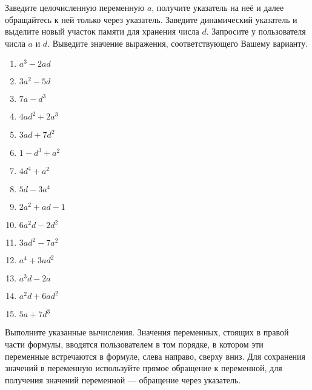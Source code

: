 
\labtask

Заведите целочисленную переменную $a$, получите указатель на неё и далее обращайтесь к ней только через указатель.
Заведите динамический указатель и выделите новый участок памяти для хранения числа $d$.
Запросите у пользователя числа $a$ и $d$.
Выведите значение выражения, соответствующего Вашему варианту.

\begin{enumerate}

\item $a^3-2ad$

\item $3a^2-5d$

\item  $7a-d^3$

\item  $4ad^2+2a^3$

\item  $3ad+7d^2$

\item  $1-d^3+a^2$

\item  $4d^4+a^2$

\item  $5d-3a^4$

\item  $2a^2+ad-1$

\item  $6a^2d-2d^2$

\item  $3ad^2-7a^2$

\item  $a^4+3ad^2$

\item  $a^3d-2a$

\item  $a^2d+6ad^2$

\item  $5a+7d^3$

\end{enumerate}


\labtask

Выполните указанные вычисления.
Значения переменных, стоящих в правой части формулы, вводятся пользователем в том порядке, в котором эти переменные встречаются в формуле, слева направо, сверху вниз.
Для сохранения значений в переменную используйте прямое обращение к переменной, для получения значений переменной --- обращение через указатель.


